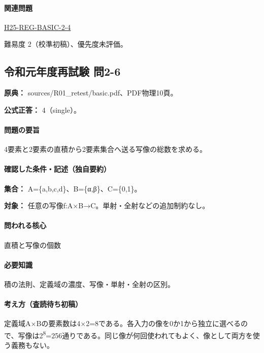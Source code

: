 \paragraph{関連問題} \hyperref[q:h25-reg-basic-2-4]{H25-REG-BASIC-2-4}

\par 難易度 2（校準初稿）、優先度未評価。

\subsection{令和元年度再試験 問2-6}
\label{q:r01-ret-basic-2-6}

\noindent\textbf{原典：} sources/R01\_retest/basic.pdf、PDF物理10頁。

\textbf{公式正答：} 4（single）。

\paragraph{問題の要旨} 4要素と2要素の直積から2要素集合へ送る写像の総数を求める。

\paragraph{確認した条件・記述（独自要約）}\mbox{}\par

\noindent\textbf{集合：} A=\{a,b,c,d\}、B=\{α,β\}、C=\{0,1\}。\par

\noindent\textbf{対象：} 任意の写像f:A×B→C。単射・全射などの追加制約なし。\par

\paragraph{問われる核心} 直積と写像の個数

\paragraph{必要知識} 積の法則、定義域の濃度、写像・単射・全射の区別。

\paragraph{考え方（査読待ち初稿）} 定義域A×Bの要素数は4×2=\allowbreak{}8である。各入力の像を0か1から独立に選べるので、写像は2\textsuperscript{8}=256通りである。同じ像が何回使われてもよく、像として両方を使う義務もない。


